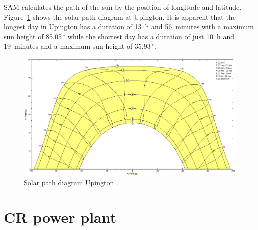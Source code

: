 \newpage \noindent
SAM calculates the path of the sun by the position of longitude and latitude. Figure~\ref{SunPathUpington} shows the solar path diagram at Upington. It is apparent that the longest day in Upington has a duration of 13~h and 56~minutes with a maximum sun height of 85.05$\,^{\circ}$ while the shortest day has a duration of just 10~h and 19~minutes and a maximum sun height of 35.93$\,^{\circ}$.

\begin{figure}[htbp]  
\centering
\includegraphics[width=0.95\linewidth]{FIG/SunPathUpington}
\caption[Solar path diagram for Upington.]{Solar path diagram Upington \cite{PVsystSA2015}.}\label{SunPathUpington}
\end{figure}
\pagebreak 
\section{CR power plant}
